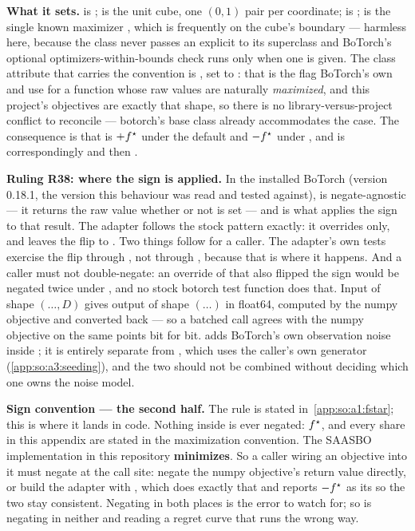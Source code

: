 \textbf{What it sets.}  is ;
 is the unit cube, one $(0,1)$ pair per coordinate;
 is ;  is the
single known maximizer , which is frequently on the
cube's boundary --- harmless here, because the class never passes an explicit
 to its superclass and BoTorch's optional
optimizers-within-bounds check runs only when one is given. The class attribute
that carries the convention is , set to
: that is the flag BoTorch's own  and
 use for a function whose raw values are naturally
\emph{maximized}, and this project's objectives are exactly that shape, so there
is no library-versus-project conflict to reconcile --- botorch's base class
already accommodates the case. The consequence is that 
is $+f^\star$ under the default  and $-f^\star$ under
, and  is correspondingly
 and then .

\textbf{Ruling R38: where the sign is applied.} In the installed BoTorch
(version 0.18.1, the version this behaviour was read and tested against),
 is negate-agnostic --- it returns the raw value whether
or not  is set --- and  is what applies the sign
to that result. The adapter follows the stock pattern exactly: it overrides
 only, and leaves the flip to . Two
things follow for a caller. The adapter's own tests exercise the flip through
, not through , because that is where it
happens. And a caller must not double-negate: an override of
 that also flipped the sign would be negated twice
under , and no stock botorch test function does that. Input of
shape $(\dots,D)$ gives output of shape $(\dots)$ in float64, computed by the
numpy objective and converted back --- so a batched call agrees with
the numpy objective on the same points bit for bit.  adds
BoTorch's own observation noise inside ; it is entirely separate
from , which uses the caller's own generator
(\ref{app:so:a3:seeding}), and the two should not be combined without deciding
which one owns the noise model.

\medskip \noindent\textbf{Sign convention --- the second half.}
The rule is stated in~\ref{app:so:a1:fstar}; this is where it lands in code. Nothing
inside  is ever negated: $f^\star$,  and
every share in this appendix are stated in the maximization convention. The
SAASBO implementation in this repository \textbf{minimizes}. So a caller wiring
an objective into it must negate at the call site: negate the numpy objective's
return value directly, or build the adapter with , which
does exactly that and reports
$-f^\star$ as its  so the two stay consistent. Negating
in both places is the error to watch for; so is negating in neither and reading
a regret curve that runs the wrong way.
\medskip

